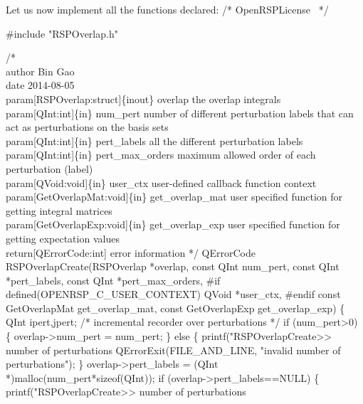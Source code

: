 Let us now implement all the functions declared:
\nwenddocs{}\endmoddef
/*
  \LA{}OpenRSPLicense~{\nwtagstyle{}}\RA{}
*/

#include "RSPOverlap.h"

/*%
    \\author Bin Gao
    \\date 2014-08-05
    \\param[RSPOverlap:struct]\{inout\} overlap the overlap integrals
    \\param[QInt:int]\{in\} num_pert number of different perturbation labels that can
        act as perturbations on the basis sets
    \\param[QInt:int]\{in\} pert_labels all the different perturbation labels
    \\param[QInt:int]\{in\} pert_max_orders maximum allowed order of each perturbation (label)
    \\param[QVoid:void]\{in\} user_ctx user-defined callback function context
    \\param[GetOverlapMat:void]\{in\} get_overlap_mat user specified function for
        getting integral matrices
    \\param[GetOverlapExp:void]\{in\} get_overlap_exp user specified function for
        getting expectation values
    \\return[QErrorCode:int] error information
*/
QErrorCode RSPOverlapCreate(RSPOverlap *overlap,
                            const QInt num_pert,
                            const QInt *pert_labels,
                            const QInt *pert_max_orders,
#if defined(OPENRSP_C_USER_CONTEXT)
                            QVoid *user_ctx,
#endif
                            const GetOverlapMat get_overlap_mat,
                            const GetOverlapExp get_overlap_exp)
\{
    QInt ipert,jpert;      /* incremental recorder over perturbations */
    if (num_pert>0) \{
        overlap->num_pert = num_pert;
    \}
    else \{
        printf("RSPOverlapCreate>> number of perturbations %
        QErrorExit(FILE_AND_LINE, "invalid number of perturbations");
    \}
    overlap->pert_labels = (QInt *)malloc(num_pert*sizeof(QInt));
    if (overlap->pert_labels==NULL) \{
        printf("RSPOverlapCreate>> number of perturbations %
